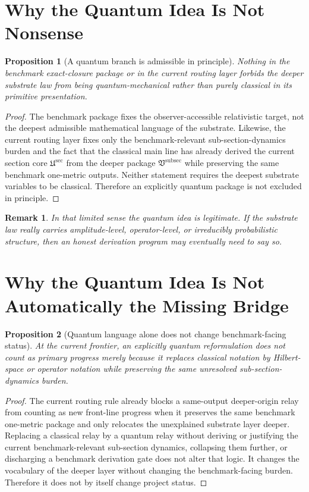 \documentclass[11pt]{article}
\newcommand{\SubPreSectionCore}{\mathfrak U^{\mathrm{sec}}}
\newcommand{\SubSectionPackage}{\mathfrak V^{\mathrm{subsec}}}
\newtheorem{proposition}{Proposition}
\newtheorem{remark}{Remark}
\begin{document}
\section{Why the Quantum Idea Is Not Nonsense}

\begin{proposition}[A quantum branch is admissible in principle]
Nothing in the benchmark exact-closure package or in the current routing layer forbids the deeper substrate law from being quantum-mechanical rather than purely classical in its primitive presentation.
\end{proposition}

\begin{proof}
The benchmark package fixes the observer-accessible relativistic target, not the deepest admissible mathematical language of the substrate. Likewise, the current routing layer fixes only the benchmark-relevant sub-section-dynamics burden and the fact that the classical main line has already derived the current section core \(\SubPreSectionCore\) from the deeper package \(\SubSectionPackage\) while preserving the same benchmark one-metric outputs. Neither statement requires the deepest substrate variables to be classical. Therefore an explicitly quantum package is not excluded in principle.
\end{proof}

\begin{remark}
In that limited sense the quantum idea is legitimate. If the substrate law really carries amplitude-level, operator-level, or irreducibly probabilistic structure, then an honest derivation program may eventually need to say so.
\end{remark}

\section{Why the Quantum Idea Is Not Automatically the Missing Bridge}

\begin{proposition}[Quantum language alone does not change benchmark-facing status]
At the current frontier, an explicitly quantum reformulation does not count as primary progress merely because it replaces classical notation by Hilbert-space or operator notation while preserving the same unresolved sub-section-dynamics burden.
\end{proposition}

\begin{proof}
The current routing rule already blocks a same-output deeper-origin relay from counting as new front-line progress when it preserves the same benchmark one-metric package and only relocates the unexplained substrate layer deeper. Replacing a classical relay by a quantum relay without deriving or justifying the current benchmark-relevant sub-section dynamics, collapsing them further, or discharging a benchmark derivation gate does not alter that logic. It changes the vocabulary of the deeper layer without changing the benchmark-facing burden. Therefore it does not by itself change project status.
\end{proof}
\end{document}
